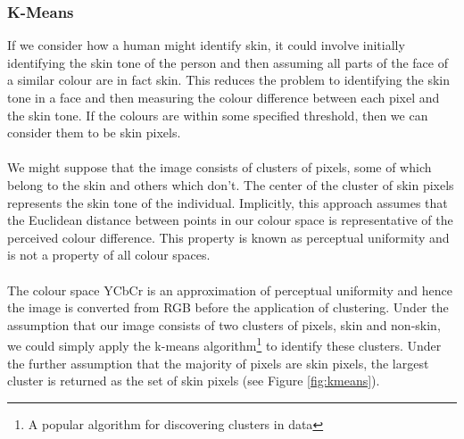 \subsubsection{K-Means}
If we consider how a human might identify skin, it could involve initially identifying the skin tone of the person and then assuming all parts of the face of a similar colour are in fact skin. This reduces the problem to identifying the skin tone in a face and then measuring the colour difference between each pixel and the skin tone. If the colours are within some specified threshold, then we can consider them to be skin pixels.
\\ \\
We might suppose that the image consists of clusters of pixels, some of which belong to the skin and others which don't. The center of the cluster of skin pixels represents the skin tone of the individual. Implicitly, this approach assumes that the Euclidean distance between points in our colour space is representative of the perceived colour difference. This property is known as perceptual uniformity and is not a property of all colour spaces. 
\\ \\
The colour space YCbCr is an approximation of perceptual uniformity and hence the image is converted from RGB before the application of clustering. 
Under the assumption that our image consists of two clusters of pixels, skin and non-skin, we could simply apply 
the k-means algorithm\footnote{A popular algorithm for discovering clusters in data} \cite{kmeans} to identify these clusters. Under the further assumption that the majority of pixels 
are skin pixels, the largest cluster is returned as the set of skin pixels (see Figure \ref{fig:kmeans}).

